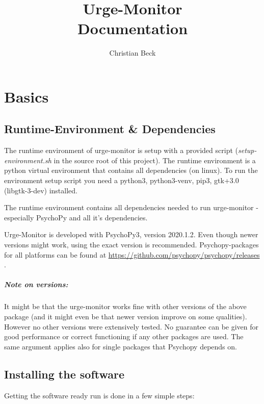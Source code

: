 \documentclass[12pt,a4paper]{book}
\title{Urge-Monitor\\Documentation}
\author{Christian Beck}
\begin{document}
\maketitle

\tableofcontents

\chapter{Basics}

\section{Runtime-Environment \& Dependencies}

The runtime environment of urge-monitor is setup with a provided script (\textit{setup-environment.sh} in the source root of this project). The runtime environment is a python virtual environment that contains all dependencies (on linux). To run the environment setup script you need a python3, python3-venv, pip3, gtk+3.0 (libgtk-3-dev) installed.

The runtime environment contains all dependencies needed to run urge-monitor - especially PsychoPy and all it's dependencies.

Urge-Monitor is developed with PsychoPy3, version 2020.1.2. Even though newer versions might work, using the exact version is recommended. Psychopy-packages for all platforms can be found at \url{https://github.com/psychopy/psychopy/releases} .

\paragraph{Note on versions:} It might be that the urge-monitor works fine with other versions of the above package (and it might even be that newer version improve on some qualities). However no other versions were extensively tested. No guarantee can be given for good performance or correct functioning if any other packages are used. The same argument applies also for single packages that Psychopy depends on.

\section{Installing the software}

Getting the software ready run is done in a few simple steps:
\end{document}
